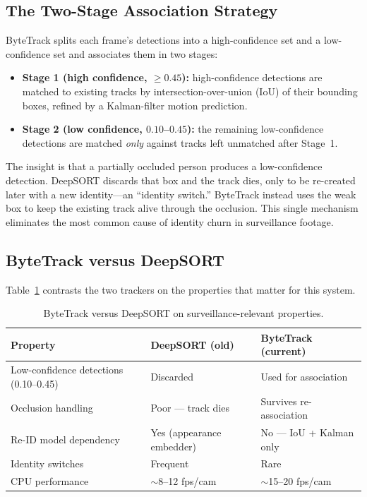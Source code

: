 \documentclass[12pt]{report}
\begin{document}
\subsection{The Two-Stage Association Strategy}
ByteTrack splits each frame's detections into a high-confidence set and a low-confidence set and associates them in two stages:
\begin{itemize}
    \item \textbf{Stage 1 (high confidence, $\geq 0.45$):} high-confidence detections are matched to existing tracks by intersection-over-union (IoU) of their bounding boxes, refined by a Kalman-filter motion prediction.
    \item \textbf{Stage 2 (low confidence, $0.10$--$0.45$):} the remaining low-confidence detections are matched \emph{only} against tracks left unmatched after Stage~1.
\end{itemize}
The insight is that a partially occluded person produces a low-confidence detection. DeepSORT discards that box and the track dies, only to be re-created later with a new identity---an ``identity switch.'' ByteTrack instead uses the weak box to keep the existing track alive through the occlusion. This single mechanism eliminates the most common cause of identity churn in surveillance footage.

\subsection{ByteTrack versus DeepSORT}
Table~\ref{tab:bytetrack} contrasts the two trackers on the properties that matter for this system.

\begin{table}[H]
\centering
\begin{tabularx}{\textwidth}{|X|l|l|}
\hline
\textbf{Property} & \textbf{DeepSORT (old)} & \textbf{ByteTrack (current)} \\
\hline
Low-confidence detections (0.10--0.45) & Discarded & Used for association \\
\hline
Occlusion handling & Poor --- track dies & Survives re-association \\
\hline
Re-ID model dependency & Yes (appearance embedder) & No --- IoU + Kalman only \\
\hline
Identity switches & Frequent & Rare \\
\hline
CPU performance & $\sim$8--12 fps/cam & $\sim$15--20 fps/cam \\
\hline
\end{tabularx}
\caption{ByteTrack versus DeepSORT on surveillance-relevant properties.}
\label{tab:bytetrack}
\end{table}
\end{document}
